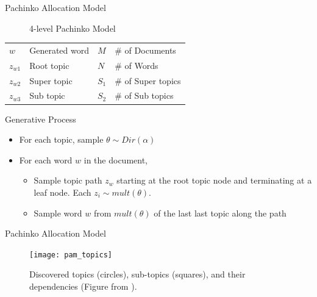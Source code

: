 \documentclass[10pt, svgnames]{beamer}
\begin{document}
\begin{frame}{Pachinko Allocation Model}
	\begin{minipage}{0.5\linewidth}
		\begin{figure}[ht]
			\caption{4-level Pachinko Model}
			\label{fig:pam_plate}
		\end{figure}
		\scriptsize{
        \begin{tabular}{llll}
            $w$ & Generated word & $M$ & \# of Documents \\
            $z_{w1}$ & Root topic  & $N$ & \# of Words\\
			$z_{w2}$ & Super topic & $S_1$ & \# of Super topics \\
			$z_{w3}$ & Sub topic & $S_2$ & \# of Sub topics
        \end{tabular}
		}
	\end{minipage}
	\begin{minipage}{0.45\linewidth}
		Generative Process
		\begin{itemize}
			\item For each topic, sample $\theta \sim Dir(\alpha)$
			\item For each word $w$ in the document,
				\begin{itemize}
					\item Sample topic path $z_w$ starting at the root topic
						node and terminating at a leaf node.  Each $z_i\sim
						mult(\theta)$.
					\item Sample word $w$ from $mult(\theta)$ of the last last
						topic along the path
				\end{itemize}
		\end{itemize}
	\end{minipage}
\end{frame}
\begin{frame}{Pachinko Allocation Model}
	\begin{figure}[ht]
		\begin{center}
			\texttt{[image: pam\_topics]}
		\end{center}
		\caption{Discovered topics (circles), sub-topics (squares), and their dependencies
		(Figure from \cite{pachinko}).}
		\label{fig:pam_topics}
	\end{figure}
\end{frame}
\end{document}
